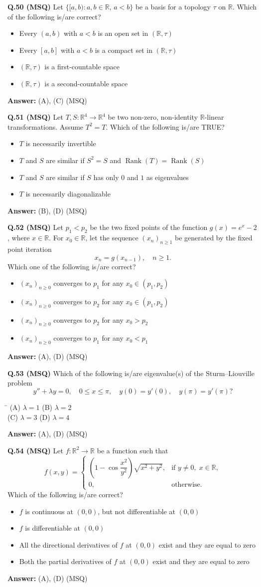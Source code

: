 \documentclass[11pt,a4paper]{article}
\newcommand{\optsfourA}[4]{%
  \begin{tabbing}
    \hspace{0.48\linewidth}\=\kill
    (A) #1 \> (B) #2 \\[2pt]
    (C) #3 \> (D) #4
  \end{tabbing}%
}
\newcommand{\optslistA}[4]{%
  \begin{itemize}
    \setlength{\itemsep}{2pt}\setlength{\parskip}{0pt}
    \item[(A)] #1
    \item[(B)] #2
    \item[(C)] #3
    \item[(D)] #4
  \end{itemize}%
}
\newcommand{\ans}[1]{\textbf{Answer:} #1\par\medskip}
\begin{document}
\textbf{Q.50 (MSQ)} Let $\{[a, b) : a, b \in \mathbb{R}, \, a < b\}$ be a basis for a topology $\tau$ on $\mathbb{R}$. Which of the following is/are correct?
\optslistA{Every $(a, b)$ with $a < b$ is an open set in $(\mathbb{R}, \tau)$}{Every $[a, b]$ with $a < b$ is a compact set in $(\mathbb{R}, \tau)$}{$(\mathbb{R}, \tau)$ is a first-countable space}{$(\mathbb{R}, \tau)$ is a second-countable space}
\ans{(A), (C) (MSQ)}

\textbf{Q.51 (MSQ)} Let $T, S : \mathbb{R}^4 \to \mathbb{R}^4$ be two non-zero, non-identity $\mathbb{R}$-linear transformations. Assume $T^2 = T$. Which of the following is/are TRUE?
\optslistA{$T$ is necessarily invertible}{$T$ and $S$ are similar if $S^2 = S$ and $\operatorname{Rank}(T) = \operatorname{Rank}(S)$}{$T$ and $S$ are similar if $S$ has only $0$ and $1$ as eigenvalues}{$T$ is necessarily diagonalizable}
\ans{(B), (D) (MSQ)}

\textbf{Q.52 (MSQ)} Let $p_1 < p_2$ be the two fixed points of the function $g(x) = e^x - 2$, where $x \in \mathbb{R}$. For $x_0 \in \mathbb{R}$, let the sequence $(x_n)_{n \ge 1}$ be generated by the fixed point iteration
\[
  x_n = g(x_{n-1}), \quad n \ge 1.
\]
Which one of the following is/are correct?
\optslistA{$(x_n)_{n \ge 0}$ converges to $p_1$ for any $x_0 \in (p_1, p_2)$}{$(x_n)_{n \ge 0}$ converges to $p_2$ for any $x_0 \in (p_1, p_2)$}{$(x_n)_{n \ge 0}$ converges to $p_2$ for any $x_0 > p_2$}{$(x_n)_{n \ge 0}$ converges to $p_1$ for any $x_0 < p_1$}
\ans{(A), (D) (MSQ)}

\textbf{Q.53 (MSQ)} Which of the following is/are eigenvalue(s) of the Sturm--Liouville problem
\[
  y'' + \lambda y = 0, \quad 0 \le x \le \pi, \quad y(0) = y'(0), \quad y(\pi) = y'(\pi)?
\]
\optsfourA{$\lambda = 1$}{$\lambda = 2$}{$\lambda = 3$}{$\lambda = 4$}
\ans{(A), (D) (MSQ)}

\textbf{Q.54 (MSQ)} Let $f : \mathbb{R}^2 \to \mathbb{R}$ be a function such that
\[
  f(x, y) = \begin{cases} \left(1 - \cos\dfrac{x^2}{y^2}\right)\sqrt{x^2 + y^2}, & \text{if } y \ne 0, \; x \in \mathbb{R}, \\ 0, & \text{otherwise.} \end{cases}
\]
Which of the following is/are correct?
\optslistA{$f$ is continuous at $(0, 0)$, but not differentiable at $(0, 0)$}{$f$ is differentiable at $(0, 0)$}{All the directional derivatives of $f$ at $(0, 0)$ exist and they are equal to zero}{Both the partial derivatives of $f$ at $(0, 0)$ exist and they are equal to zero}
\ans{(A), (D) (MSQ)}
\end{document}
